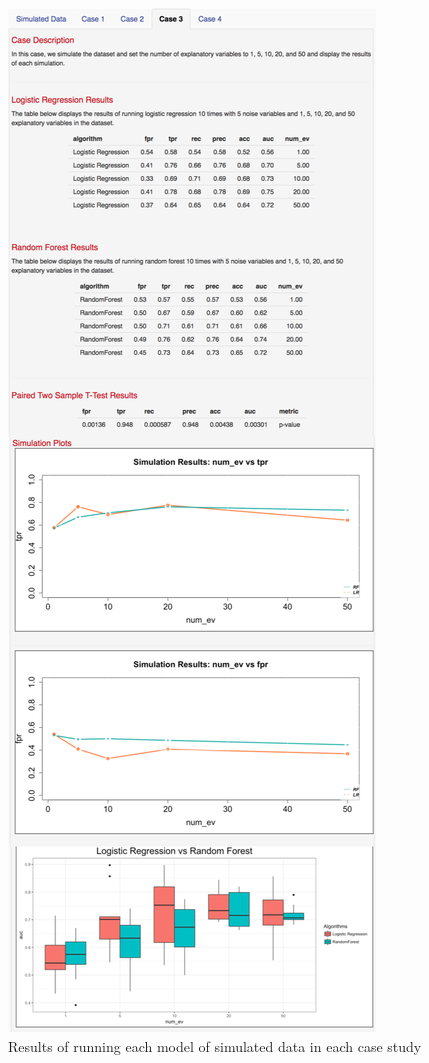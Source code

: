 \documentclass{llncs}
\begin{document}
\begin{figure}
\centering
\includegraphics[scale=0.75]{results_long_2.png}
\caption{Results of running each model of simulated data in each case study}
\label{fig:center-content}
\end{figure}
\end{document}
